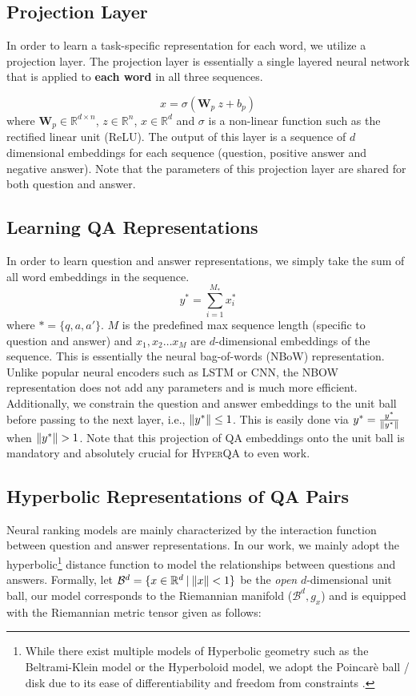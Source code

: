 \documentclass[sigconf]{acmart}
\DeclarePairedDelimiter\norm{\lVert}{\rVert}\fancyhead{}
\begin{document}
\subsection{Projection Layer}
In order to learn a task-specific representation for each word, we utilize a projection layer. The projection layer is essentially a single layered neural network that is applied to \textbf{each word} in all three sequences. 

\begin{equation}
x = \sigma(\textbf{W}_p \:z + b_p)
\end{equation}
where $\textbf{W}_p \in \mathbb{R}^{d \times n}$, $z \in \mathbb{R}^{n}$, $x \in \mathbb{R}^{d}$ and $\sigma$ is a non-linear function such as the rectified linear unit (ReLU). The output of this layer is a sequence of $d$ dimensional embeddings for each sequence (question, positive answer and negative answer). Note that the parameters of this projection layer are shared for both question and answer. 

\subsection{Learning QA Representations}
In order to learn question and answer representations, we simply take the sum of all word embeddings in the sequence. 
\begin{equation}
y^{*} = \sum_{i=1}^{M_*} x_{i}^{*}
\end{equation}
\label{qa_sec}
where $*=\{q,a,a'\}$. $M$ is the predefined max sequence length (specific to question and answer) and $x_1, x_2 \dots x_{M}$ are $d$-dimensional embeddings of the sequence. This is essentially the neural bag-of-words (NBoW) representation. Unlike popular neural encoders such as LSTM or CNN, the NBOW representation does not add any parameters and is much more efficient. Additionally, we constrain the question and answer embeddings to the unit ball before passing to the next layer, i.e.,  $\norm{y^*} \leq 1$. This is easily done via $y^* = \frac{y^*}{\norm{y^*}}$  when $\norm{y^*} > 1$. Note that this projection of QA embeddings onto the unit ball is mandatory and absolutely crucial for \textsc{HyperQA} to even work. 

\subsection{Hyperbolic Representations of QA Pairs}
Neural ranking models are mainly characterized by the interaction function between question and answer representations. In our work, we mainly adopt the hyperbolic\footnote{While there exist multiple models of Hyperbolic geometry such as the Beltrami-Klein model or the Hyperboloid model, we adopt the Poincar\`e ball / disk due to its ease of differentiability and freedom from constraints \cite{DBLP:journals/corr/NickelK17}.} distance function to model the relationships between questions and answers. Formally, let $\mathcal{B}^{d} = \{x \in \mathbb{R}^{d} \:|\: \norm{x} < 1 \}$ be the \textit{open} $d$-dimensional unit ball, our model corresponds to the Riemannian manifold ($\mathcal{B}^{d}, g_{x}$) and is equipped with the Riemannian metric tensor given as follows:
\end{document}
